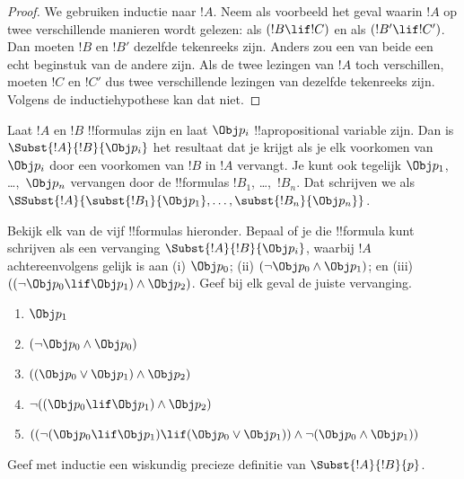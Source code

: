 \documentclass[openany]{memoir}
\begin{document}
\begin{proof}
We gebruiken inductie naar $!A$. Neem als voorbeeld het geval waarin
$!A$ op twee verschillende manieren wordt gelezen: als $(!B \lif !C)$
en als $(!B' \lif !C')$. Dan moeten $!B$ en $!B'$ dezelfde tekenreeks
zijn. Anders zou een van beide een echt beginstuk van de andere zijn.
Als de twee lezingen van $!A$ toch verschillen, moeten $!C$ en $!C'$
dus twee verschillende lezingen van dezelfde tekenreeks zijn. Volgens
de inductiehypothese kan dat niet.
\end{proof}


\begin{defn}
Laat $!A$ en $!B$ !!{formula}s zijn en laat $\Obj p_i$
!!a{propositional variable} zijn. Dan is
  $\Subst{!A}{!B}{\Obj p_i}$ het resultaat dat je krijgt als je elk
  voorkomen van $\Obj p_i$ door een voorkomen van $!B$ in $!A$ vervangt.
Je kunt ook tegelijk $\Obj p_1$, \dots,~$\Obj p_n$ vervangen door de
!!{formula}s $!B_1$, \dots,~$!B_n$. Dat schrijven we als
$\SSubst{!A}{\subst{!B_1}{\Obj p_1},\dots,\subst{!B_n}{\Obj p_n}}$.
\end{defn}

\begin{prob} Bekijk elk van de vijf !!{formula}s hieronder. Bepaal of
 je die !!{formula} kunt schrijven als een vervanging
 \( \Subst{!A}{!B}{\Obj p_i} \), waarbij \( !A \) achtereenvolgens
 gelijk is aan (i) \( \Obj p_0 \); (ii) \( ( \lnot \Obj p_0 \land \Obj
 p_1) \); en (iii) \( ( ( \lnot \Obj p_0 \lif \Obj p_1 ) \land \Obj
 p_2 ) \). Geef bij elk geval de juiste vervanging.
  \begin{enumerate}
    \item \( \Obj p_1 \) 
    \item \( ( \lnot \Obj p_0 \land \Obj p_0 ) \)
    \item \( ( ( \Obj p_0 \lor \Obj p_1 ) \land \Obj p_2 )  \)
    \item \( \lnot ( ( \Obj p_0 \lif \Obj p_1 ) \land \Obj p_2 ) \)
    \item \( (( \lnot ( \Obj p_0 \lif \Obj p_1 ) \lif ( \Obj p_0 \lor \Obj p_1 )) \land \lnot ( \Obj p_0 \land \Obj p_1 )) \)
  \end{enumerate}
\end{prob}

\begin{prob}
Geef met inductie een wiskundig precieze definitie van
$\Subst{!A}{!B}{p}$.
\end{prob}
\endgroup
\end{document}
